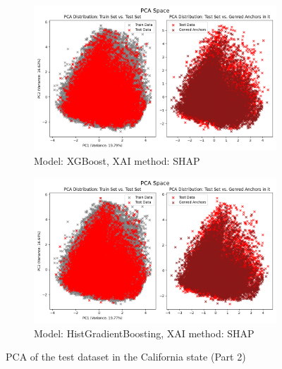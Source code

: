 \begin{figure}[h]
    \ContinuedFloat
    \begin{subfigure}[b]{0.9\textwidth}
        \includegraphics[width=\textwidth]{Images/pca/pca_xg_ca_shap.png}
        \caption{Model: XGBoost, XAI method: SHAP}
        \label{fig:pca_xg_ca_shap}
    \end{subfigure}
    \hfill
    \begin{subfigure}[b]{0.9\textwidth}
        \includegraphics[width=\textwidth]{Images/pca/pca_skrub_ca_shap.png}
        \caption{Model: HistGradientBoosting, XAI method: SHAP}
        \label{fig:pca_skrub_ca_shap}
    \end{subfigure}
    \caption{PCA of the test dataset in the California state (Part 2)}
    \label{fig:pca_ca}
\end{figure}
    


